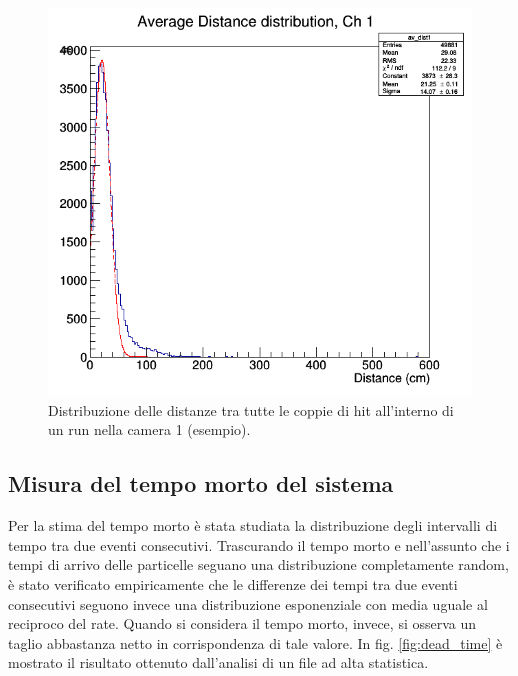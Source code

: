 \documentclass[8pt]{extarticle}
\begin{document}
\begin{figure}
\begin{center}
\includegraphics[scale=0.3]{dis_correlazione}
\caption{Distribuzione delle distanze tra tutte le coppie di hit all'interno di un run nella camera 1 (esempio).}
\label{fig:dis_correlazione}
\end{center}
\end{figure}

\subsection{Misura del tempo morto del sistema}
Per la stima del tempo morto è stata studiata la distribuzione degli intervalli di tempo tra due eventi consecutivi. Trascurando il tempo morto e nell'assunto che i tempi di arrivo delle particelle seguano una distribuzione completamente random, è stato verificato empiricamente che le differenze dei tempi tra due eventi consecutivi seguono invece una distribuzione esponenziale con media uguale al reciproco del rate. Quando si considera il tempo morto, invece, si osserva un taglio abbastanza netto in corrispondenza di tale valore. In fig. \ref{fig:dead_time} è mostrato il risultato ottenuto dall'analisi di un file ad alta statistica.
\end{document}
